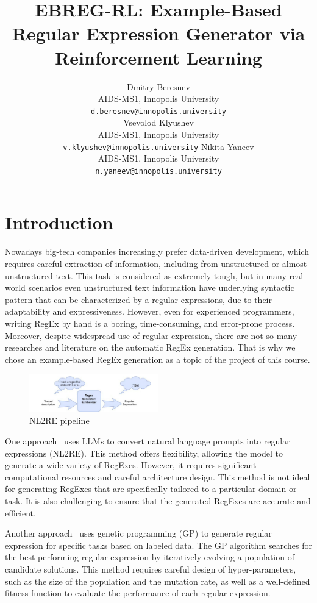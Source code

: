 \documentclass{article}
\title{EBREG-RL: Example-Based Regular Expression Generator
via Reinforcement Learning}
\date{} 					%
\author{
  \hspace{1mm}Dmitry Beresnev\\
	AIDS-MS1, Innopolis University\\
	\texttt{d.beresnev@innopolis.university}\\
	\And{}
  \hspace{1mm}Vsevolod Klyushev\\
	AIDS-MS1, Innopolis University\\
	\texttt{v.klyushev@innopolis.university}	\And{}
  \hspace{1mm}Nikita Yaneev\\
	AIDS-MS1, Innopolis University\\
	\texttt{n.yaneev@innopolis.university}
}
\begin{document}
\maketitle


\section{Introduction}

Nowadays big-tech companies increasingly prefer data-driven development, which requires careful extraction of
information, including from unstructured or almost unstructured text. This task is considered as extremely tough,
but in many real-world scenarios even unstructured text information have underlying syntactic pattern that can be
characterized by a regular expressions, due to their adaptability and expressiveness.
However, even for experienced programmers, writing RegEx by hand is a boring, time-consuming, and error-prone
process. Moreover, despite widespread use of regular expression, there are not so many researches and literature on
the automatic RegEx generation. That is why we chose an example-based RegEx generation as a topic of the project of
this course.

\begin{figure}[H]
  \centering
  \includegraphics[width=0.5\textwidth]{./pictures/approach1.png}
  \caption[NL2RE pipeline]{NL2RE pipeline}\label{fig:NL2RE}
\end{figure}

One approach~\cite{Zhong2018, Tariq2024} uses LLMs to convert natural language prompts into regular expressions (NL2RE).
This method offers flexibility, allowing the model to generate a wide variety of RegExes.
However, it requires significant computational resources and careful architecture design.
This method is not ideal for generating RegExes that are specifically tailored to a particular domain or task.
It is also challenging to ensure that the generated RegExes are accurate and efficient.

Another approach~\cite{Bartoli2016, Bartoli2018} uses genetic programming (GP) to generate regular expression for specific tasks based on labeled
data. The GP algorithm searches for the best-performing regular expression by iteratively evolving a population of
candidate solutions. This method requires careful design of hyper-parameters, such as the size of the population and
the mutation rate, as well as a well-defined fitness function to evaluate the performance of each regular expression.
\end{document}
